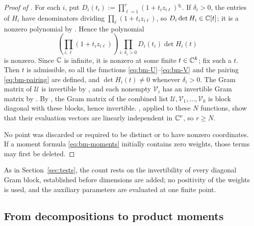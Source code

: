 \begin{proof}[Proof of ]
For each $i$, put $D_i(t_i):=\prod_{\ell=1}^r(1+t_iz_{i\ell})^{q_i}$.
If $\delta_i>0$, the entries of $H_i$ have denominators dividing
$\prod_\ell(1+t_iz_{i\ell})$, so $D_i\det H_i\in\mathbb C[t]$; it is a
nonzero polynomial by . Hence the polynomial
\begin{equation}\label{eq:bm-avoidance}
\left(\prod_{i,\ell}(1+t_iz_{i\ell})\right)
\prod_{i:\,\delta_i>0}D_i(t_i)\det H_i(t)
\end{equation}
is nonzero. Since $\mathbb C$ is infinite, it is nonzero at some finite
$t\in\mathbb C^k$; fix such a $t$. Then $t$ is admissible, so all the
functions \eqref{eq:bm-U}--\eqref{eq:bm-V} and the pairing
\eqref{eq:bm-pairing} are defined, and $\det H_i(t)\ne0$ whenever
$\delta_i>0$. The Gram matrix of $\mathscr U$ is invertible by
, and each nonempty $\mathscr V_i$ has an
invertible Gram matrix by . By ,
the Gram matrix of the combined list
$\mathscr U,\mathscr V_1,\ldots,\mathscr V_k$ is block diagonal with
these blocks, hence invertible. , applied
to these $N$ functions, show that their evaluation vectors are
linearly independent in $\mathbb C^r$, so $r\ge N$.

No point was discarded or required to be distinct or to have nonzero
coordinates. If a moment formula \eqref{eq:bm-moments} initially
contains zero weights, those terms may first be deleted.
\end{proof}

As in Section~\ref{sec:tests}, the count rests on the invertibility of
every diagonal Gram block, established before dimensions are added;
no positivity of the weights is used, and the auxiliary parameters are
evaluated at one finite point.

\subsection{From decompositions to product moments}

